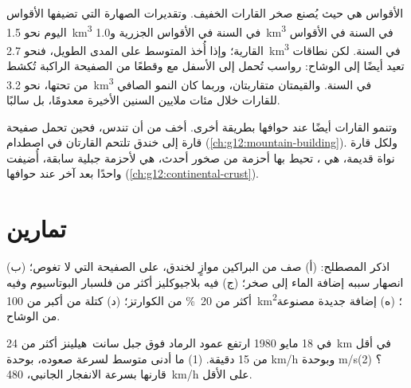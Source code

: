 الأقواس هي حيث يُصنع صخر القارات الخفيف. وتقديرات
الصهارة التي تضيفها الأقواس اليوم نحو \qty{1.5}{km^3} في السنة في الأقواس الجزرية
و\qty{1.0}{km^3} في السنة في الأقواس القارية؛ وإذا أُخذ المتوسط على المدى الطويل،
فنحو \qty{2.7}{km^3} في السنة. لكن نطاقات  تعيد أيضًا  إلى الوشاح: رواسب تُحمل إلى الأسفل مع  وقطعًا
من الصفيحة الراكبة تُكشط من تحتها، نحو \qty{3.2}{km^3} في السنة.
والقيمتان متقاربتان، وربما كان النمو الصافي للقارات خلال
مئات ملايين السنين الأخيرة معدومًا، بل سالبًا.

وتنمو القارات أيضًا عند حوافها بطريقة أخرى.  أخف
من أن تندس، فحين تحمل صفيحة قارة إلى خندق
تلتحم القارتان في اصطدام
(\cref{ch:g12:mountain-building}). ولكل قارة نواة قديمة، هي ،
تحيط بها أحزمة من صخور أحدث، هي  لأحزمة جبلية
سابقة، أُضيفت واحدًا بعد آخر عند حوافها
(\cref{ch:g12:continental-crust}).

\section{تمارين}

\begin{exercise}[$\star$]\label{exo:g12:subduction-magmatism:1}
اذكر المصطلح: (أ) صف من البراكين موازٍ لخندق، على الصفيحة
التي لا تغوص؛ (ب) انصهار سببه إضافة الماء إلى صخر؛ (ج)  فيه بلاجيوكليز أكثر من فلسبار البوتاسيوم وفيه أكثر من
\qty{20}{\percent} من الكوارتز؛ (د) كتلة من  أكبر من
\qty{100}{km^2}؛ (ه) إضافة  جديدة مصنوعة من
الوشاح.
\end{exercise}

\begin{exercise}[$\star$]\label{exo:g12:subduction-magmatism:2}
في 18 مايو 1980 ارتفع عمود الرماد فوق جبل سانت~هيلينز أكثر من \qty{24}{km}
في أقل من 15 دقيقة. (1) ما أدنى متوسط لسرعة صعوده، بوحدة
\unit{km/h} وبوحدة \unit{m/s}؟ (2) قارنها بسرعة الانفجار
الجانبي، \qty{480}{km/h} على الأقل.
\end{exercise}

